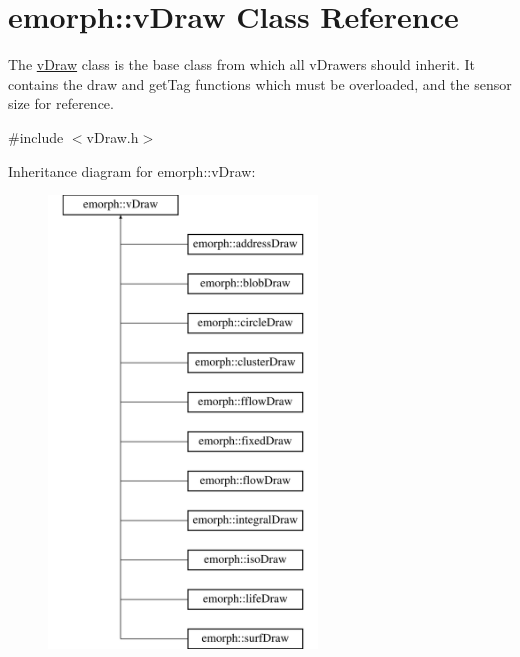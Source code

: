 \hypertarget{classemorph_1_1vDraw}{\section{emorph\-:\-:v\-Draw Class Reference}
\label{classemorph_1_1vDraw}
}


The \hyperlink{classemorph_1_1vDraw}{v\-Draw} class is the base class from which all v\-Drawers should inherit. It contains the draw and get\-Tag functions which must be overloaded, and the sensor size for reference.  




{\ttfamily \#include $<$v\-Draw.\-h$>$}

Inheritance diagram for emorph\-:\-:v\-Draw\-:\begin{figure}[H]
\begin{center}
\leavevmode
\includegraphics[height=12.000000cm]{classemorph_1_1vDraw}
\end{center}
\end{figure}
